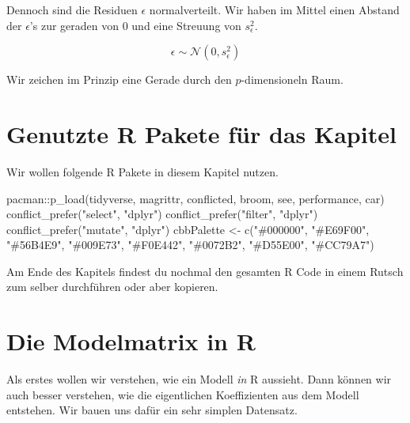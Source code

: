 \documentclass[
  letterpaper,
]{scrbook}
\newenvironment{Shaded}{\begin{snugshade}}{\end{snugshade}}
\newcommand{\FunctionTok}[1]{\textcolor[rgb]{0.28,0.35,0.67}{#1}}
\newcommand{\NormalTok}[1]{\textcolor[rgb]{0.00,0.23,0.31}{#1}}
\newcommand{\OtherTok}[1]{\textcolor[rgb]{0.00,0.23,0.31}{#1}}
\newcommand{\SpecialCharTok}[1]{\textcolor[rgb]{0.37,0.37,0.37}{#1}}
\newcommand{\StringTok}[1]{\textcolor[rgb]{0.13,0.47,0.30}{#1}}
\begin{document}
Dennoch sind die Residuen \(\epsilon\) normalverteilt. Wir haben im
Mittel einen Abstand der \(\epsilon\)'s zur geraden von 0 und eine
Streuung von \(s^2_{\epsilon}\).

\[
\epsilon \sim \mathcal{N}(0, s^2_{\epsilon})
\]

Wir zeichen im Prinzip eine Gerade durch den \(p\)-dimensioneln Raum.

\hypertarget{genutzte-r-pakete-fuxfcr-das-kapitel-19}{%
\section{Genutzte R Pakete für das
Kapitel}\label{genutzte-r-pakete-fuxfcr-das-kapitel-19}}

Wir wollen folgende R Pakete in diesem Kapitel nutzen.

\begin{Shaded}
\begin{Highlighting}[]
\NormalTok{pacman}\SpecialCharTok{::}\FunctionTok{p\_load}\NormalTok{(tidyverse, magrittr, conflicted, broom,}
\NormalTok{               see, performance, car)}
\FunctionTok{conflict\_prefer}\NormalTok{(}\StringTok{"select"}\NormalTok{, }\StringTok{"dplyr"}\NormalTok{)}
\FunctionTok{conflict\_prefer}\NormalTok{(}\StringTok{"filter"}\NormalTok{, }\StringTok{"dplyr"}\NormalTok{)}
\FunctionTok{conflict\_prefer}\NormalTok{(}\StringTok{"mutate"}\NormalTok{, }\StringTok{"dplyr"}\NormalTok{)}
\NormalTok{cbbPalette }\OtherTok{\textless{}{-}} \FunctionTok{c}\NormalTok{(}\StringTok{"\#000000"}\NormalTok{, }\StringTok{"\#E69F00"}\NormalTok{, }\StringTok{"\#56B4E9"}\NormalTok{, }\StringTok{"\#009E73"}\NormalTok{, }
                \StringTok{"\#F0E442"}\NormalTok{, }\StringTok{"\#0072B2"}\NormalTok{, }\StringTok{"\#D55E00"}\NormalTok{, }\StringTok{"\#CC79A7"}\NormalTok{)}
\end{Highlighting}
\end{Shaded}

Am Ende des Kapitels findest du nochmal den gesamten R Code in einem
Rutsch zum selber durchführen oder aber kopieren.

\hypertarget{die-modelmatrix-in-r}{%
\section{Die Modelmatrix in R}\label{die-modelmatrix-in-r}}

Als erstes wollen wir verstehen, wie ein Modell \emph{in} R aussieht.
Dann können wir auch besser verstehen, wie die eigentlichen
Koeffizienten aus dem Modell entstehen. Wir bauen uns dafür ein sehr
simplen Datensatz.
\end{document}
